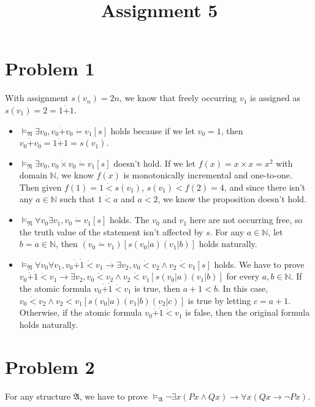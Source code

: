 \documentclass{article}
\title{\huge{\textbf{Assignment 5}}}
\author{\Chi{杨乐天}}
\date{}
\begin{document}
\maketitle

\section*{Problem 1}

With assignment $s(v_n)=2n$, we know that freely occurring $v_1$ is assigned as $s(v_1)=2=1 \dot+ 1$.
\begin{itemize}
\item
$\vDash_{\mathfrak{N}} \exists v_0, v_0 \dot+ v_0 \dot= v_1[s]$ holds because if we let $v_0=1$, then $v_0 \dot+ v_0 = 1 \dot+ 1 = s(v_1)$.
\item
$\vDash_{\mathfrak{N}} \exists v_0, v_0 \dot\times v_0 \dot= v_1[s]$ doesn't hold. If we let $f(x)=x\times x=x^2$ with domain $\mathbb{N}$, we know $f(x)$ is monotonically incremental and one-to-one. Then given $f(1)=1 \dot< s(v_1)$, $s(v_1) \dot< f(2)=4$, and since there isn't any $a\in\mathbb{N}$ such that $1\dot< a$ and $a \dot< 2$, we know the proposition doesn't hold.
\item
$\vDash_{\mathfrak{N}} \forall v_0 \exists v_1, v_0 \dot= v_1[s]$ holds. The $v_0$ and $v_1$ here are not occurring free, so the truth value of the statement isn't affected by $s$. For any $a\in\mathbb{N}$, let $b=a\in\mathbb{N}$, then $(v_0\dot= v_1)[s(v_0|a)(v_1|b)]$ holds naturally.
\item
$\vDash_{\mathfrak{N}} \forall v_0 \forall v_1, v_0 \dot+ \dot1 \dot< v_1 \to \exists v_2, v_0 \dot< v_2 \land v_2 \dot< v_1[s]$ holds. We have to prove $v_0 \dot+ \dot1 \dot< v_1 \to \exists v_2, v_0 \dot< v_2 \land v_2 \dot< v_1[s(v_0|a)(v_1|b)]$ for every $a,b\in\mathbb{N}$. If the atomic formula $v_0 \dot+ \dot1 \dot< v_1$ is true, then $a+1<b$. In this case, $v_0 \dot< v_2 \land v_2 \dot< v_1[s(v_0|a)(v_1|b)(v_2|c)]$ is true by letting $c=a+1$. Otherwise, if the atomic formula $v_0 \dot+ \dot1 \dot< v_1$ is false, then the original formula holds naturally.
\end{itemize}



\section*{Problem 2}

For any structure $\mathfrak{A}$, we have to prove $\vDash_{\mathfrak{A}} \neg\exists x (Px \land Qx) \to \forall x (Qx \to \neg Px)$.
\end{document}
